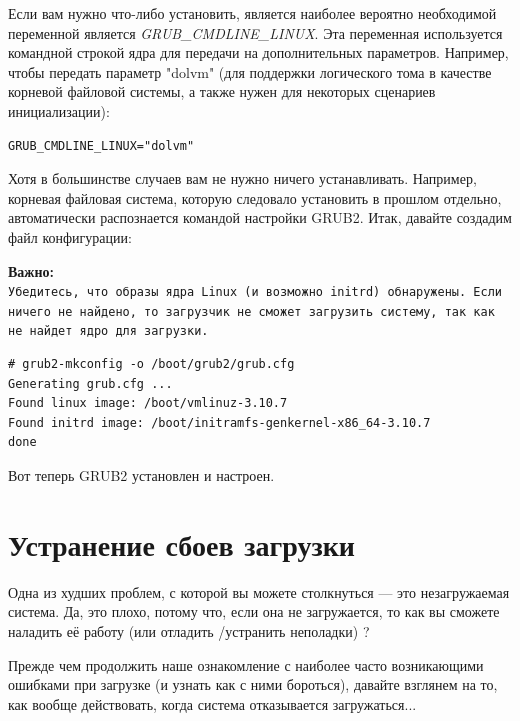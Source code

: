 \documentclass[10pt]{book}
\begin{document}
Если вам нужно что-либо установить, является наиболее вероятно необходимой переменной является \textit{GRUB\_CMDLINE\_LINUX}. Эта переменная используется командной строкой ядра для передачи на дополнительных параметров. Например, чтобы передать параметр "dolvm" (для поддержки логического тома в качестве корневой файловой системы, а также нужен для некоторых сценариев инициализации):

\vspace{3mm}
\begin{tcolorbox}
\begin{lstlisting}
GRUB_CMDLINE_LINUX="dolvm"
\end{lstlisting}
\end{tcolorbox}

Хотя в большинстве случаев вам не нужно ничего устанавливать. Например, корневая файловая система, которую следовало установить в прошлом отдельно, автоматически распознается командой настройки GRUB2.
Итак, давайте создадим файл конфигурации:

\begin{tcolorbox}
\textbf{Важно:}\\
\texttt{Убедитесь, что образы ядра Linux (и возможно initrd) обнаружены. Если ничего не найдено,  то загрузчик не сможет загрузить систему, так как не найдет ядро для загрузки.}
\end{tcolorbox}

\vspace{3mm}
\begin{tcolorbox}
\begin{lstlisting}
# grub2-mkconfig -o /boot/grub2/grub.cfg
Generating grub.cfg ...
Found linux image: /boot/vmlinuz-3.10.7
Found initrd image: /boot/initramfs-genkernel-x86_64-3.10.7
done
\end{lstlisting}
\end{tcolorbox}

Вот теперь GRUB2 установлен и настроен.

\section{Устранение сбоев загрузки}

Одна из худших проблем, с которой вы можете столкнуться — это незагружаемая система. Да, это плохо, потому что, если она не загружается, то как вы сможете наладить её работу (или отладить /устранить неполадки) ? 

Прежде чем продолжить наше ознакомление с наиболее часто возникающими ошибками при загрузке (и узнать как с ними бороться), давайте взглянем на то, как вообще действовать, когда система отказывается загружаться...
\end{document}
